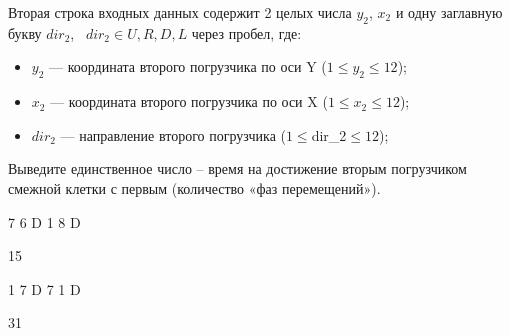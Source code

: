 Вторая строка входных данных содержит 2 целых числа $y_{2}$, $x_{2}$ и одну заглавную букву $dir_{2}$,~ $dir_{2} \in {U,R,D,L}$ через пробел, где:
\begin{itemize}
    \item $y_{2}$ --- координата второго погрузчика по оси Y ($1 \leq y_{2} \leq 12$);
    \item $x_{2}$ --- координата второго погрузчика по оси X ($1 \leq x_{2} \leq 12$);
	\item $dir_{2}$ --- направление второго погрузчика ($1 \leq $dir_{2}$ \leq 12$);
\end{itemize}

\outputfmtSection

Выведите единственное число – время на достижение вторым погрузчиком смежной клетки с первым (количество «фаз перемещений»).


\exampleSection



\begin{myverbbox}[\small]{\vinput}
    7 6 D
	1 8 D
\end{myverbbox}
\begin{myverbbox}[\small]{\voutput}
    15
\end{myverbbox}


\begin{myverbbox}[\small]{\vinput}
    1 7 D
	7 1 D
\end{myverbbox}
\begin{myverbbox}[\small]{\voutput}
    31
\end{myverbbox}


